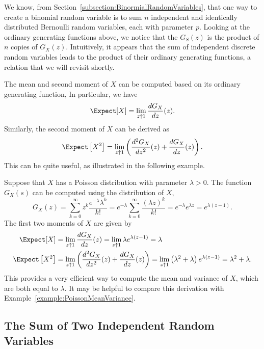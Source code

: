 We know, from Section~\ref{subsection:BinormialRandomVariables}, that one way to create a binomial random variable is to sum $n$ independent and identically distributed Bernoulli random variables, each with parameter $p$.
Looking at the ordinary generating functions above, we notice that the $G_S(z)$ is the product of $n$ copies of $G_X(z)$.
Intuitively, it appears that the sum of independent discrete random variables leads to the product of their ordinary generating functions, a relation that we will revisit shortly.

The mean and second moment of $X$ can be computed based on its ordinary generating function,
In particular, we have
\begin{equation*}
\Expect [X] = \lim_{z \uparrow 1} \frac{d G_X}{dz}(z) .
\end{equation*}
Similarly, the second moment of $X$ can be derived as
\begin{equation*}
\Expect \left[ X^2 \right]
= \lim_{z \uparrow 1} \left( \frac{d^2 G_X}{dz^2}(z) + \frac{d G_X}{dz}(z) \right) .
\end{equation*}
This can be quite useful, as illustrated in the following example.

\begin{example}
Suppose that $X$ has a Poisson distribution with parameter $\lambda > 0$.
The function $G_X(s)$ can be computed using the distribution of $X$,
\begin{equation*}
G_X(z) = \sum_{k = 0}^\infty z^{k} \frac{e^{-\lambda}\lambda^k}{k!}
= e^{-\lambda} \sum_{k = 0}^\infty \frac{(\lambda z)^k}{k!}
= e^{-\lambda} e^{\lambda z} = e^{\lambda(z - 1)} .
\end{equation*}
The first two moments of $X$ are given by
\begin{align*}
\Expect [X] &= \lim_{z \uparrow 1} \frac{d G_X}{dz} (z)
= \lim_{z \uparrow 1} \lambda e^{\lambda(z - 1)} = \lambda \\
\Expect \left[ X^2 \right] &= \lim_{z \uparrow 1}
\left( \frac{d^2 G_X}{dz^2} (z) + \frac{d G_X}{dz} (z) \right)
= \lim_{z \uparrow 1} \left( \lambda^2 + \lambda \right)
e^{\lambda (z - 1)} = \lambda^2 + \lambda .
\end{align*}
This provides a very efficient way to compute the mean and variance of $X$, which are both equal to $\lambda$.
It may be helpful to compare this derivation with Example~\ref{example:PoissonMeanVariance}.
\end{example}

\subsection{The Sum of Two Independent Random Variables}

